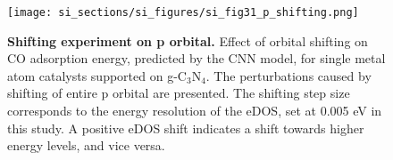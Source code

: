 \begin{figure}
  \centering
  \texttt{[image: si\_sections/si\_figures/si\_fig31\_p\_shifting.png]}
  \caption{\textbf{Shifting experiment on p orbital.}
  Effect of orbital shifting on CO adsorption energy, predicted by the CNN model,
  for single metal atom catalysts supported on g-C$_3$N$_4$.
  The perturbations caused by shifting of entire p orbital are presented.
  The shifting step size corresponds to the energy resolution of the eDOS, set at 0.005 eV in this study.
  A positive eDOS shift indicates a shift towards higher energy levels, and vice versa.}
  \label{si_fig31:p_shifting}
\end{figure}
